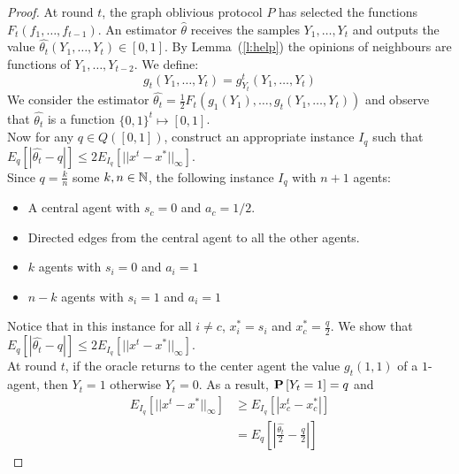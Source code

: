 \begin{proof}
At round $t$, the graph oblivious protocol $P$ has selected the functions $F_t(f_1,\ldots,f_{t-1})$. An estimator $\hat{\theta}$ receives the samples $Y_1,\ldots,Y_t$ and outputs the value $\hat{\theta_t}(Y_1,\ldots,Y_t) \in [0,1]$. By Lemma~(\ref{l:help}) the opinions of neighbours are functions of $Y_1, \ldots, Y_{t-2}$. 
We define:
\[
g_t(Y_1,\ldots,Y_t) = g_{Y_t}^t(Y_1,\ldots,Y_t) 
\]
We consider the estimator $\hat{\theta_t}=\frac{1}{2}F_t(g_1(Y_1),\ldots,g_t(Y_1,\ldots, Y_t))$ and observe that $\hat{\theta_t}$ is a function $\{0,1\}^t \mapsto [0,1]$.\\
Now for any $q \in Q([0,1])$, construct an appropriate instance $I_q$ such that $E_q[|\hat{\theta_t} - q|] \leq 2E_{I_q}[||x^t-x^*||_{\infty}]$.\\
Since $q=\frac{k}{n}$ some $k,n \in \mathbb{N}$, the following instance $I_q$ with $n+1$ agents:
\begin{itemize}
 \item A central agent with $s_c=0$ and $a_c=1/2$.
 \item Directed edges from the central agent to all the other agents.
 \item $k$ agents with $s_i=0$ and $a_i=1$
 \item $n-k$ agents with $s_i=1$ and $a_i=1$
 \end{itemize}
Notice that in this instance for all $i\neq c$, $x^*_i=s_i$ and $x^*_c=\frac{q}{2}$. We show that $E_q[|\hat{\theta_t}-q|] \leq 2E_{I_q}[||x^t-x^*||_{\infty}]$.\\
At round $t$, if the oracle returns to the center agent the value $g_t(1,1)$ of a $1$-agent, then $Y_t=1$ otherwise $Y_t=0$. As a result, $\bm{\mathrm{P}}\left[Y_t=1\right]=q$ and 
\begin{align*}
 E_{I_q}[||x^t-x^*||_{\infty}] &\geq E_{I_q}[|x^t_c-x^*_c|]\\
 &= E_{q}[|\frac{\hat{\theta_t}}{2}-\frac{q}{2}|]
\end{align*}

\end{proof}

